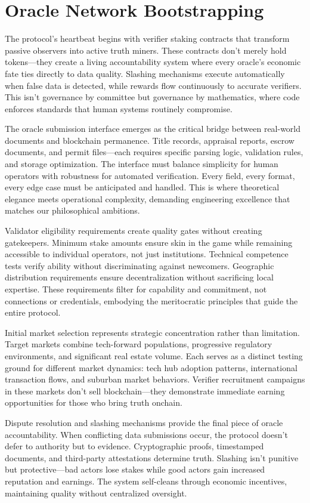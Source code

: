 \section{Oracle Network Bootstrapping}

The protocol's heartbeat begins with verifier staking contracts that transform passive observers into active truth miners. These contracts don't merely hold tokens—they create a living accountability system where every oracle's economic fate ties directly to data quality. Slashing mechanisms execute automatically when false data is detected, while rewards flow continuously to accurate verifiers. This isn't governance by committee but governance by mathematics, where code enforces standards that human systems routinely compromise.

The oracle submission interface emerges as the critical bridge between real-world documents and blockchain permanence. Title records, appraisal reports, escrow documents, and permit files—each requires specific parsing logic, validation rules, and storage optimization. The interface must balance simplicity for human operators with robustness for automated verification. Every field, every format, every edge case must be anticipated and handled. This is where theoretical elegance meets operational complexity, demanding engineering excellence that matches our philosophical ambitions.

Validator eligibility requirements create quality gates without creating gatekeepers. Minimum stake amounts ensure skin in the game while remaining accessible to individual operators, not just institutions. Technical competence tests verify ability without discriminating against newcomers. Geographic distribution requirements ensure decentralization without sacrificing local expertise. These requirements filter for capability and commitment, not connections or credentials, embodying the meritocratic principles that guide the entire protocol.

Initial market selection represents strategic concentration rather than limitation. Target markets combine tech-forward populations, progressive regulatory environments, and significant real estate volume. Each serves as a distinct testing ground for different market dynamics: tech hub adoption patterns, international transaction flows, and suburban market behaviors. Verifier recruitment campaigns in these markets don't sell blockchain—they demonstrate immediate earning opportunities for those who bring truth onchain.

Dispute resolution and slashing mechanisms provide the final piece of oracle accountability. When conflicting data submissions occur, the protocol doesn't defer to authority but to evidence. Cryptographic proofs, timestamped documents, and third-party attestations determine truth. Slashing isn't punitive but protective—bad actors lose stakes while good actors gain increased reputation and earnings. The system self-cleans through economic incentives, maintaining quality without centralized oversight.

